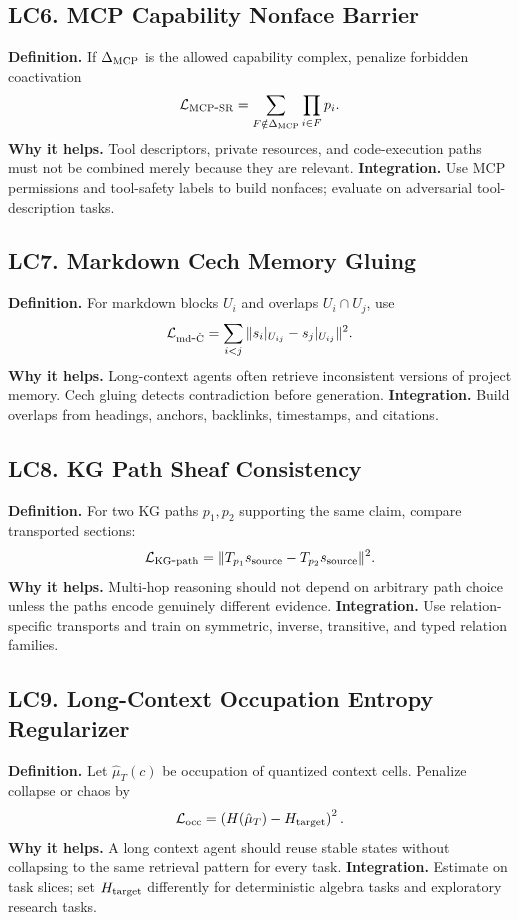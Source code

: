 \documentclass[11pt]{article}
\newcommand{\loss}{\mathcal{L}}
\numberwithin{equation}{section}
\begin{document}
\subsection{LC6. MCP Capability Nonface Barrier}
\textbf{Definition.} If $\Delta_{\rm MCP}$ is the allowed capability complex, penalize forbidden coactivation
\begin{equation}
\loss_{\rm MCP\mbox{-}SR}=\sum_{F\notin\Delta_{\rm MCP}}\prod_{i\in F}p_i.
\end{equation}
\textbf{Why it helps.} Tool descriptors, private resources, and code-execution paths must not be combined merely because they are relevant. \textbf{Integration.} Use MCP permissions and tool-safety labels to build nonfaces; evaluate on adversarial tool-description tasks.

\subsection{LC7. Markdown Cech Memory Gluing}
\textbf{Definition.} For markdown blocks $U_i$ and overlaps $U_i\cap U_j$, use
\begin{equation}
\loss_{\rm md\mbox{-}\check C}=\sum_{i<j}\|s_i|_{U_{ij}}-s_j|_{U_{ij}}\|^2.
\end{equation}
\textbf{Why it helps.} Long-context agents often retrieve inconsistent versions of project memory. Cech gluing detects contradiction before generation. \textbf{Integration.} Build overlaps from headings, anchors, backlinks, timestamps, and citations.

\subsection{LC8. KG Path Sheaf Consistency}
\textbf{Definition.} For two KG paths $p_1,p_2$ supporting the same claim, compare transported sections:
\begin{equation}
\loss_{\rm KG\mbox{-}path}=\|T_{p_1}s_{\rm source}-T_{p_2}s_{\rm source}\|^2.
\end{equation}
\textbf{Why it helps.} Multi-hop reasoning should not depend on arbitrary path choice unless the paths encode genuinely different evidence. \textbf{Integration.} Use relation-specific transports and train on symmetric, inverse, transitive, and typed relation families.

\subsection{LC9. Long-Context Occupation Entropy Regularizer}
\textbf{Definition.} Let $\hat\mu_T(c)$ be occupation of quantized context cells. Penalize collapse or chaos by
\begin{equation}
\loss_{\rm occ}=\left(H(\hat\mu_T)-H_{\rm target}\right)^2.
\end{equation}
\textbf{Why it helps.} A long context agent should reuse stable states without collapsing to the same retrieval pattern for every task. \textbf{Integration.} Estimate on task slices; set $H_{\rm target}$ differently for deterministic algebra tasks and exploratory research tasks.
\end{document}
